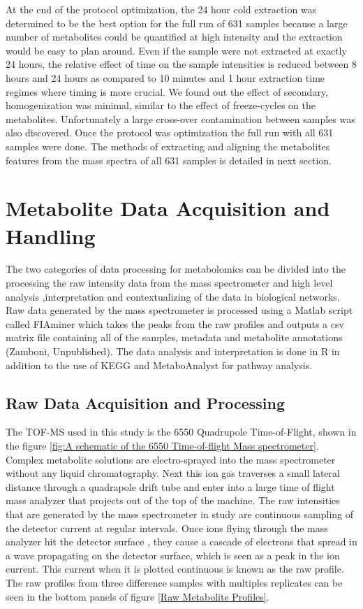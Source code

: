 \documentclass[a4paper]{book}
\begin{document}
	At the end of the protocol optimization, the 24 hour cold extraction was determined to be the best option for the full run of 631 samples because a large number of metabolites could be quantified at high intensity and the extraction would be easy to plan around. Even if the sample were not extracted at exactly 24 hours, the relative effect of time on the sample intensities is reduced between 8 hours and 24 hours as compared to 10 minutes and 1 hour extraction time regimes where timing is more crucial. We found out the effect of secondary, homogenization was minimal, similar to the effect of freeze-cycles on the metabolites. Unfortunately a large cross-over contamination between samples was also discovered. Once the protocol was optimization the full run with all 631 samples were done. The methods of extracting and aligning the metabolites features from the mass spectra of all 631 samples is detailed in next section.
	
	\clearpage
	\section{Metabolite Data Acquisition and Handling}
	
	The two categories of data processing for metabolomics can be divided into the processing the raw intensity data from the mass spectrometer and high level analysis ,interpretation and contextualizing of the data in biological networks. Raw data generated by the mass spectrometer is processed using a Matlab script called FIAminer which takes the peaks from the raw profiles and outputs a csv matrix file containing all of the samples, metadata and metabolite annotations (Zamboni, Unpublished). The data analysis and interpretation is done in R in addition to the use of KEGG \citep{Kanehisa2017} and MetaboAnalyst\citep{Xia2016UsingAnalysis} for pathway analysis.
	
	\subsection{Raw Data Acquisition and Processing}
	
	The TOF-MS used in this study is the 6550 Quadrupole Time-of-Flight, shown in the figure \ref{fig:A schematic of the 6550 Time-of-flight Mass spectrometer}. Complex metabolite solutions are electro-sprayed into the mass spectrometer without any liquid chromatography. Next this ion gas traverses a small lateral distance through a quadrapole drift tube and enter into a large time of flight mass analyzer that projects out of the top of the machine. The raw intensities that are generated by the mass spectrometer in study are continuous sampling of the detector current at regular intervals. Once ions flying through the mass analyzer hit the detector surface \citep{Glish2003TheCentury}, they cause a cascade of electrons that spread in a wave propagating on the detector surface, which is seen as a peak in the ion current. This current when it is plotted continuous is known as the raw profile. The raw profiles from three difference samples with multiples replicates can be seen in the bottom panels of figure \ref{Raw Metabolite Profiles}. 
	
\end{document}
